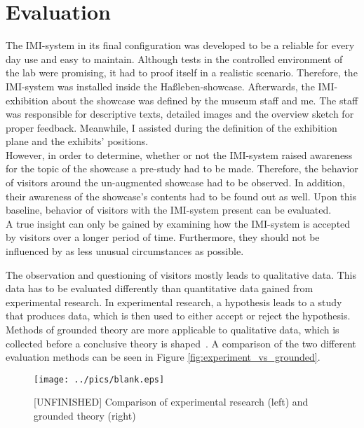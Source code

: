 \chapter{Evaluation}
\label{evaluation}

The \ac{IMI}-system in its final configuration was developed to be a reliable for every day use and easy to maintain. Although tests in the controlled environment of the lab were promising, it had to proof itself in a realistic scenario. Therefore, the \ac{IMI}-system was installed inside the Haßleben-showcase. Afterwards, the \ac{IMI}-exhibition about the showcase was defined by the museum staff and me. The staff was responsible for descriptive texts, detailed images and the overview sketch for proper feedback. Meanwhile, I assisted during the definition of the exhibition plane and the exhibits' positions.
\\
However, in order to determine, whether or not the \ac{IMI}-system raised awareness for the topic of the showcase a pre-study had to be made. Therefore, the behavior of visitors around the un-augmented showcase had to be observed. In addition, their awareness of the showcase's contents had to be found out as well. Upon this baseline, behavior of visitors with the \ac{IMI}-system present can be evaluated.
\\
A true insight can only be gained by examining how the \ac{IMI}-system is accepted by visitors over a longer period of time. Furthermore, they should not be influenced by as less unusual circumstances as possible.

The observation and questioning of visitors mostly leads to qualitative data. This data has to be evaluated differently than quantitative data gained from experimental research. In experimental research, a hypothesis leads to a study that produces data, which is then used to either accept or reject the hypothesis. Methods of grounded theory are more applicable to qualitative data, which is collected before a conclusive theory is shaped~\cite{GroundedTheory}. A comparison of the two different evaluation methods can be seen in Figure \ref{fig:experiment_vs_grounded}.
\begin{figure}[H]%
\texttt{[image: ../pics/blank.eps]}%
\caption{[UNFINISHED] Comparison of experimental research (left) and grounded theory (right)~\cite{GroundedTheory}}
\label{fig:new_target} %
\end{figure}
 
